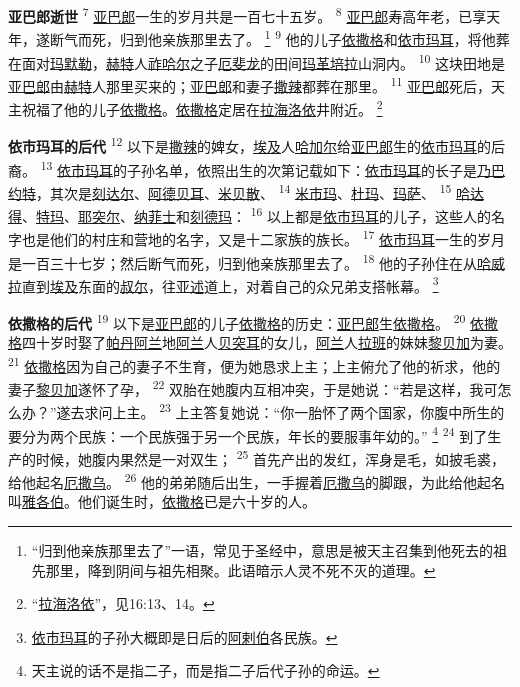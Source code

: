\textbf{亚巴郎逝世\quad}
\textsuperscript{7}
\uline{亚巴郎}一生的岁月共是一百七十五岁。
\textsuperscript{8}
\uline{亚巴郎}寿高年老，已享天年，遂断气而死，归到他亲族那里去了。
\footnote{“归到他亲族那里去了”一语，常见于圣经中，意思是被天主召集到他死去的祖先那里，降到阴间与祖先相聚。此语暗示人灵不死不灭的道理。}
\textsuperscript{9}
他的儿子\uline{依撒格}和\uline{依市玛耳}，将他葬在面对\uline{玛默勒}，\uline{赫特}人\uline{祚哈尔}之子\uline{厄斐龙}的田间\uline{玛革}\uline{培拉}山洞内。
\textsuperscript{10}
这块田地是\uline{亚巴郎}由\uline{赫特}人那里买来的；\uline{亚巴郎}和妻子\uline{撒辣}都葬在那里。
\textsuperscript{11}
\uline{亚巴郎}死后，天主祝福了他的儿子\uline{依撒格}。\uline{依撒格}定居在\uline{拉海}\uline{洛依}井附近。
\footnote{“\uline{拉海}\uline{洛依}”，见16:13、14。}

\textbf{依市玛耳的后代\quad}
\textsuperscript{12}
以下是\uline{撒辣}的婢女，\uline{埃及}人\uline{哈加尔}给\uline{亚巴郎}生的\uline{依市玛耳}的后裔。
\textsuperscript{13}
\uline{依市玛耳}的子孙名单，依照出生的次第记载如下：\uline{依市玛耳}的长子是\uline{乃巴约特}，其次是\uline{刻达尔}、\uline{阿德贝耳}、\uline{米贝散}、
\textsuperscript{14}
\uline{米市玛}、\uline{杜玛}、\uline{玛萨}、
\textsuperscript{15}
\uline{哈达得}、\uline{特玛}、\uline{耶突尔}、\uline{纳菲士}和\uline{刻德玛}：
\textsuperscript{16}
以上都是\uline{依市玛耳}的儿子，这些人的名字也是他们的村庄和营地的名字，又是十二家族的族长。
\textsuperscript{17}
\uline{依市玛耳}一生的岁月是一百三十七岁；然后断气而死，归到他亲族那里去了。
\textsuperscript{18}
他的子孙住在从\uline{哈威拉}直到\uline{埃及}东面的\uline{叔尔}，往\uline{亚述}道上，对着自己的众兄弟支搭帐幕。
\footnote{\uline{依市玛耳}的子孙大概即是日后的\uline{阿剌伯}各民族。}

\textbf{依撒格的后代\quad}
\textsuperscript{19}
以下是\uline{亚巴郎}的儿子\uline{依撒格}的历史：\uline{亚巴郎}生\uline{依撒格}。
\textsuperscript{20}
\uline{依撒格}四十岁时娶了\uline{帕丹}\uline{阿兰}地\uline{阿兰}人\uline{贝突耳}的女儿，\uline{阿兰}人\uline{拉班}的妹妹\uline{黎贝加}为妻。
\textsuperscript{21}
\uline{依撒格}因为自己的妻子不生育，便为她恳求上主；上主俯允了他的祈求，他的妻子\uline{黎贝加}遂怀了孕，
\textsuperscript{22}
双胎在她腹内互相冲突，于是她说：“若是这样，我可怎么办？”遂去求问上主。
\textsuperscript{23}
上主答复她说：“你一胎怀了两个国家，你腹中所生的要分为两个民族：一个民族强于另一个民族，年长的要服事年幼的。”
\footnote{天主说的话不是指二子，而是指二子后代子孙的命运。}
\textsuperscript{24}
到了生产的时候，她腹内果然是一对双生；
\textsuperscript{25}
首先产出的发红，浑身是毛，如披毛裘，给他起名\uline{厄撒乌}。
\textsuperscript{26}
他的弟弟随后出生，一手握着\uline{厄撒乌}的脚跟，为此给他起名叫\uline{雅各伯}。他们诞生时，\uline{依撒格}已是六十岁的人。

